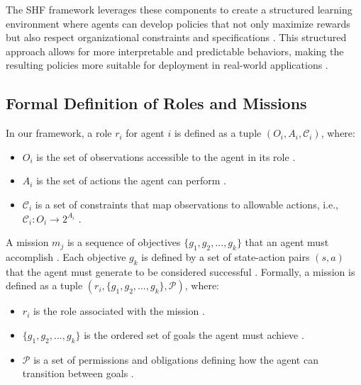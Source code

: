 \documentclass[sigconf,anonymous]{aamas}
\begin{document}

The SHF framework leverages these components to create a structured learning environment where agents can develop policies that not only maximize rewards but also respect organizational constraints and specifications \cite{hubner2010moise}. This structured approach allows for more interpretable and predictable behaviors, making the resulting policies more suitable for deployment in real-world applications \cite{ghosal2021explainable}.

\subsection{Formal Definition of Roles and Missions}
In our framework, a role $r_i$ for agent $i$ is defined as a tuple $(O_i, A_i, \mathcal{C}_i)$, where:

\begin{itemize}
    \item $O_i$ is the set of observations accessible to the agent in its role \cite{hubner2010moise}.
    \item $A_i$ is the set of actions the agent can perform \cite{foerster2016learning}.
    \item $\mathcal{C}_i$ is a set of constraints that map observations to allowable actions, i.e., $\mathcal{C}_i: O_i \rightarrow 2^{A_i}$ \cite{hubner2010moise, castaneda2019policy}.
\end{itemize}

A mission $m_j$ is a sequence of objectives $\{g_1, g_2, ..., g_k\}$ that an agent must accomplish \cite{hubner2010moise}. Each objective $g_k$ is defined by a set of state-action pairs $(s, a)$ that the agent must generate to be considered successful \cite{hernandez2019survey}. Formally, a mission is defined as a tuple $(r_i, \{g_1, g_2, ..., g_k\}, \mathcal{P})$, where:

\begin{itemize}
    \item $r_i$ is the role associated with the mission \cite{hubner2010moise}.
    \item $\{g_1, g_2, ..., g_k\}$ is the ordered set of goals the agent must achieve \cite{hernandez2019survey}.
    \item $\mathcal{P}$ is a set of permissions and obligations defining how the agent can transition between goals \cite{hubner2010moise, castaneda2019policy}.
\end{itemize}
\end{document}

